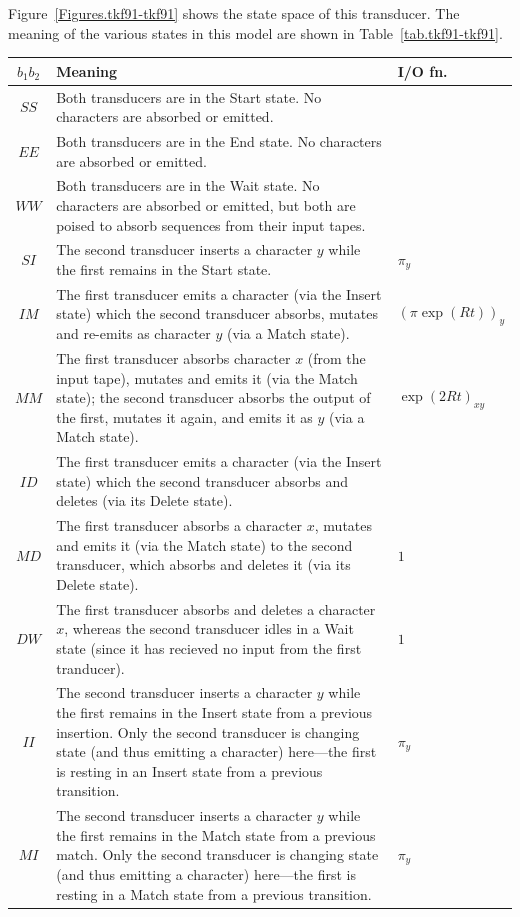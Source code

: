 \documentclass{article}
\newcommand{\tabnum}[1]{\ref{tab.#1}}
\newcommand{\tabref}[1]{Table~\tabnum{#1}}
\newcommand{\figref}[1]{Figure~\ref{Figures.#1}}
\begin{document}
\figref{tkf91-tkf91} shows the state space of this transducer.  
The meaning of the various states in this model are shown in \tabref{tkf91-tkf91}.

\begin{table}
\begin{tabular}{c|p{}|p{}}
$b_1 b_2$ & Meaning & I/O fn. \\
\hline
$SS$ & Both transducers are in the Start state.  No characters are absorbed or emitted. &  \\
$EE$ & Both transducers are in the End state.  No characters are  absorbed or emitted. &  \\
$WW$ & Both transducers are in the Wait state.  No characters are absorbed or emitted, but both are poised to absorb sequences from their input tapes. &  \\
$SI$ & The second transducer inserts a character $y$ while the first remains in the Start state.  & $\pi_y$ \\
$IM$ & The first transducer  emits a character (via the Insert state) which the second transducer absorbs, mutates and re-emits as character $y$ (via a Match state).  & $(\pi \exp(Rt))_y$ \\
$MM$ & The first transducer absorbs character $x$ (from the input tape), mutates and emits it (via the Match state); the second transducer absorbs the output of the first, mutates it again, and emits it as $y$ (via a Match state).  & $\exp(2Rt)_{xy}$ \\
$ID$ & The first transducer  emits a character (via the Insert state) which the second transducer absorbs and deletes (via its Delete state).  &  \\
$MD$ & The first transducer  absorbs a character $x$, mutates and emits it (via the Match state) to the second transducer, which absorbs and deletes it (via its Delete state).  & $1$ \\
$DW$ & The first transducer absorbs and deletes a character $x$, whereas the second transducer idles in a Wait state (since it has recieved no input from the first tranducer).   & $1$ \\
$II$ & The second transducer inserts a character $y$ while the first remains in the Insert state from a previous insertion.  Only the second transducer is changing state (and thus emitting a character) here---the first is resting in an Insert state from a previous transition.   & $\pi_y$ \\
$MI$ & The second transducer inserts a character $y$ while the first remains in the Match state from a previous match.  Only the second transducer is changing state (and thus emitting a character) here---the first is resting in a Match state from a previous transition. & $\pi_y$ \\

\end{tabular}
\end{table}
\end{document}
